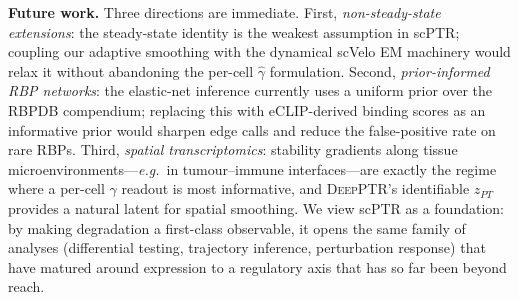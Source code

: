 \documentclass{article}
\begin{document}
\textbf{Future work.} Three directions are immediate. First, \textit{non-steady-state extensions}: the steady-state identity is the weakest assumption in scPTR; coupling our adaptive smoothing with the dynamical scVelo EM machinery would relax it without abandoning the per-cell $\widehat{\gamma}$ formulation. Second, \textit{prior-informed RBP networks}: the elastic-net inference currently uses a uniform prior over the RBPDB compendium; replacing this with eCLIP-derived \cite{vannostrand2020} binding scores as an informative prior would sharpen edge calls and reduce the false-positive rate on rare RBPs. Third, \textit{spatial transcriptomics}: stability gradients along tissue microenvironments---\textit{e.g.}\ in tumour--immune interfaces---are exactly the regime where a per-cell $\gamma$ readout is most informative, and \textsc{DeepPTR}'s identifiable $z_{PT}$ provides a natural latent for spatial smoothing. We view scPTR as a foundation: by making degradation a first-class observable, it opens the same family of analyses (differential testing, trajectory inference, perturbation response) that have matured around expression to a regulatory axis that has so far been beyond reach.
\end{document}
